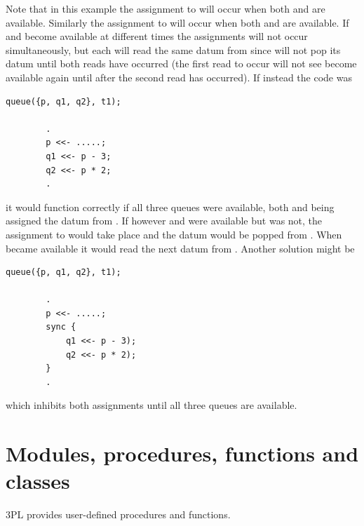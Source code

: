         Note that in this example the assignment to  will occur when both
         and  are available. Similarly  the assignment to  will
        occur when both  and  are available. If  and 
        become available at different times the assignments will not occur
        simultaneously, but each will read the same datum from  since 
        will not pop its datum until both reads have occurred (the first read to occur
        will not see  become available again until after the second read has
        occurred). If instead the code was
        \begin{lstlisting}[language=threepl]
        queue({p, q1, q2}, t1);

        .
        p <<- .....;
        q1 <<- p - 3;
        q2 <<- p * 2;
        .
        \end{lstlisting}
        it would function correctly if all three queues were available, both 
        and  being assigned the datum from . If however  and
         were available but  was not, the assignment to  would
        take place and the datum would be popped from . When  became
        available it would read the next datum from . Another solution might be 
        \begin{lstlisting}[language=threepl]
        queue({p, q1, q2}, t1);

        .
        p <<- .....;
        sync {
            q1 <<- p - 3);
            q2 <<- p * 2);
        }
        .
        \end{lstlisting}
        which inhibits both assignments until all three queues are available.



    \section{Modules, procedures, functions and classes}

        3PL provides user-defined procedures and functions.

